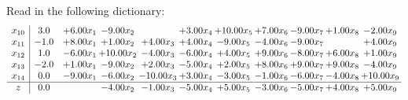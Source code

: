 \documentclass[9pt]{article}
\begin{document}
Read in the following dictionary:
\[\begin{array}{c| c c@{\hskip 2pt} c@{\hskip 2pt} c@{\hskip 2pt} c@{\hskip 2pt} c@{\hskip 2pt} c@{\hskip 2pt} c@{\hskip 2pt} c@{\hskip 2pt} c@{\hskip 2pt} }
 x_{10}   &  3.0 & +  6.00 x_{1} & -9.00 x_{2} &   & +  3.00 x_{4} & + 10.00 x_{5} & +  7.00 x_{6} & -9.00 x_{7} & +  1.00 x_{8} & -2.00 x_{9}\\
 x_{11}   &  -1.0 & +  8.00 x_{1} & +  1.00 x_{2} & +  4.00 x_{3} & +  4.00 x_{4} & -9.00 x_{5} & -4.00 x_{6} & -9.00 x_{7} &   & +  4.00 x_{9}\\
 x_{12}   &  1.0 & -6.00 x_{1} & + 10.00 x_{2} & -4.00 x_{3} & -6.00 x_{4} & +  4.00 x_{5} & +  9.00 x_{6} & -8.00 x_{7} & +  6.00 x_{8} & +  1.00 x_{9}\\
 x_{13}   &  -2.0 & +  1.00 x_{1} & -9.00 x_{2} & +  2.00 x_{3} & -5.00 x_{4} & +  2.00 x_{5} & +  8.00 x_{6} & +  9.00 x_{7} & +  9.00 x_{8} & -4.00 x_{9}\\
 x_{14}   &  0.0 & -9.00 x_{1} & -6.00 x_{2} & -10.00 x_{3} & +  3.00 x_{4} & -3.00 x_{5} & -1.00 x_{6} & -6.00 x_{7} & -4.00 x_{8} & + 10.00 x_{9}\\
\hline
z    &  0.0  &   & -4.00 x_{2} & -1.00 x_{3} & -5.00 x_{4} & +  5.00 x_{5} & -3.00 x_{6} & -5.00 x_{7} & +  4.00 x_{8} & +  5.00 x_{9}\\
\end{array}\]
\end{document}

